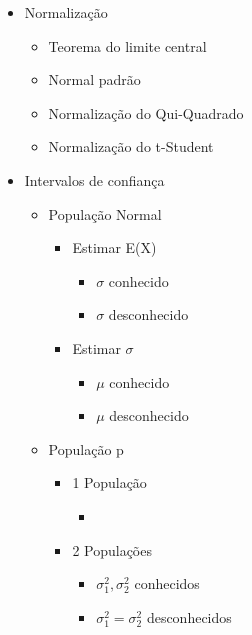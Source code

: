 \documentclass{article}
\begin{document}
\begin{itemize}
    \item Normalização
    \begin{itemize}
        \item Teorema do limite central
        \item Normal padrão
        \item Normalização do Qui-Quadrado
        \item Normalização do t-Student
    \end{itemize}
    \item Intervalos de confiança
    \begin{itemize}
        \item População Normal
        \begin{itemize}
            \item Estimar E(X)
            \begin{itemize}
                \item $\sigma$ conhecido
                \item $\sigma$ desconhecido
            \end{itemize}
            \item Estimar $\sigma$
            \begin{itemize}
                \item $\mu$ conhecido
                \item $\mu$ desconhecido
            \end{itemize}
        \end{itemize}
        \item População p
        \begin{itemize}
            \item 1 População
            \begin{itemize}
                \item
            \end{itemize}
            \item 2 Populações
            \begin{itemize}
                \item $\sigma_1^2, \sigma_2^2$ conhecidos
                \item $\sigma_1^2 = \sigma_2^2$ desconhecidos
            \end{itemize}
        \end{itemize}
    \end{itemize}
\end{itemize}
\end{document}
